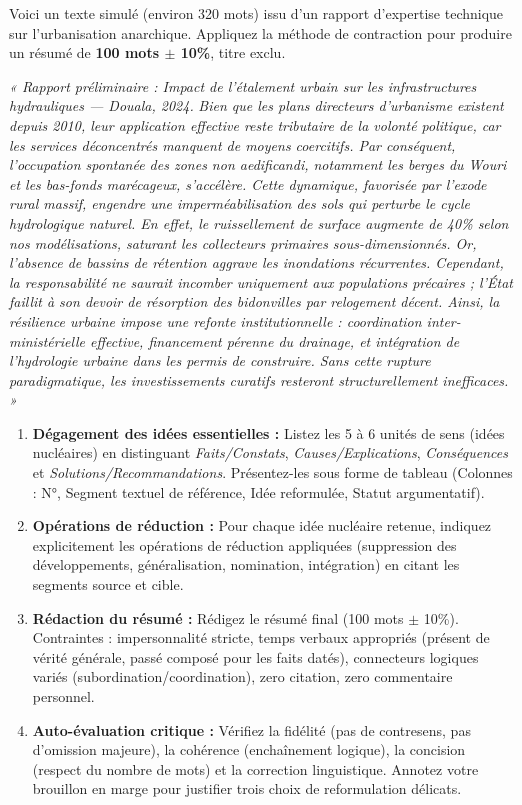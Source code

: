 \documentclass[11pt]{article}
\begin{document}
\begin{exercice}
Voici un texte simulé (environ 320 mots) issu d'un rapport d'expertise technique sur l'urbanisation anarchique. Appliquez la méthode de contraction pour produire un résumé de \textbf{100 mots $\pm$ 10\%}, titre exclu.

\textit{« Rapport préliminaire : Impact de l'étalement urbain sur les infrastructures hydrauliques — Douala, 2024.}
\textit{Bien que les plans directeurs d'urbanisme existent depuis 2010, leur application effective reste tributaire de la volonté politique, car les services déconcentrés manquent de moyens coercitifs. Par conséquent, l'occupation spontanée des zones non aedificandi, notamment les berges du Wouri et les bas-fonds marécageux, s'accélère. Cette dynamique, favorisée par l'exode rural massif, engendre une imperméabilisation des sols qui perturbe le cycle hydrologique naturel. En effet, le ruissellement de surface augmente de 40\% selon nos modélisations, saturant les collecteurs primaires sous-dimensionnés. Or, l'absence de bassins de rétention aggrave les inondations récurrentes. Cependant, la responsabilité ne saurait incomber uniquement aux populations précaires ; l'État faillit à son devoir de résorption des bidonvilles par relogement décent. Ainsi, la résilience urbaine impose une refonte institutionnelle : coordination inter-ministérielle effective, financement pérenne du drainage, et intégration de l'hydrologie urbaine dans les permis de construire. Sans cette rupture paradigmatique, les investissements curatifs resteront structurellement inefficaces. »}

\begin{enumerate}
    \item \textbf{Dégagement des idées essentielles :} Listez les 5 à 6 unités de sens (idées nucléaires) en distinguant \textit{Faits/Constats}, \textit{Causes/Explications}, \textit{Conséquences} et \textit{Solutions/Recommandations}. Présentez-les sous forme de tableau (Colonnes : N°, Segment textuel de référence, Idée reformulée, Statut argumentatif).
    \item \textbf{Opérations de réduction :} Pour chaque idée nucléaire retenue, indiquez explicitement les opérations de réduction appliquées (suppression des développements, généralisation, nomination, intégration) en citant les segments source et cible.
    \item \textbf{Rédaction du résumé :} Rédigez le résumé final (100 mots $\pm$ 10\%). Contraintes : impersonnalité stricte, temps verbaux appropriés (présent de vérité générale, passé composé pour les faits datés), connecteurs logiques variés (subordination/coordination), zero citation, zero commentaire personnel.
    \item \textbf{Auto-évaluation critique :} Vérifiez la fidélité (pas de contresens, pas d'omission majeure), la cohérence (enchaînement logique), la concision (respect du nombre de mots) et la correction linguistique. Annotez votre brouillon en marge pour justifier trois choix de reformulation délicats.
\end{enumerate}
\end{exercice}
\end{document}
